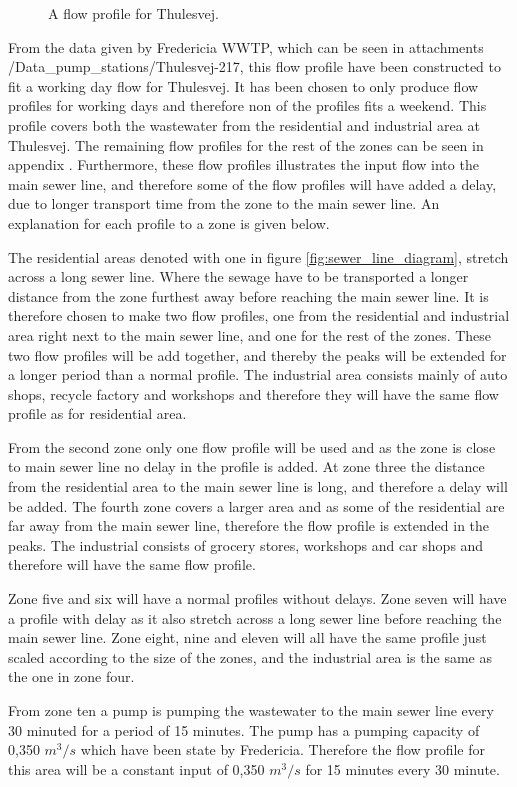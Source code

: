 \begin{figure}[H]
\centering

\caption{A flow profile for Thulesvej.}
\label{fig:flow_profile_thulevej}
\end{figure}  

From the data given by Fredericia WWTP, which can be seen in attachments /Data\_pump\_stations/Thulesvej-217, this flow profile have been constructed to fit a working day flow for Thulesvej. It has been chosen to only produce flow profiles for working days and therefore non of the profiles fits a weekend. This profile covers both the wastewater from the residential and industrial area at Thulesvej. The remaining flow profiles for the rest of the zones can be seen in appendix . Furthermore, these flow profiles illustrates the input flow into the main sewer line, and therefore some of the flow profiles will have added a delay, due to longer transport time from the zone to the main sewer line. An explanation for each profile to a zone is given below.    

The residential areas denoted with one in figure \ref{fig:sewer_line_diagram}, stretch across a long sewer line. Where the sewage have to be transported a longer distance from the zone furthest away before reaching the main sewer line. It is therefore chosen to make two flow profiles, one from the residential and industrial area right next to the main sewer line, and one for the rest of the zones. These two flow profiles will be add together, and thereby the peaks will be extended for a longer period than a normal profile. The industrial area consists mainly of auto shops, recycle factory and workshops and therefore they will have the same flow profile as for residential area. 

From the second zone only one flow profile will be used and as the zone is close to main sewer line no delay in the profile is added. At zone three the distance from the residential area to the main sewer line is long, and therefore a delay will be added. The fourth zone covers a larger area and as some of the residential are far away from the main sewer line, therefore the flow profile is extended in the peaks. The industrial consists of grocery stores, workshops and car shops and therefore will have the same flow profile.

Zone five and six will have a normal profiles without delays. Zone seven will have a profile with delay as it also stretch across a long sewer line before reaching the main sewer line. Zone eight, nine and eleven will all have the same profile just scaled according to the size of the zones, and the industrial area is the same as the one in zone four. 

From zone ten a pump is pumping the wastewater to the main sewer line every 30 minuted for a period of 15 minutes. The pump has a pumping capacity of 0,350 $m^3/s$ which have been state by Fredericia. Therefore the flow profile for this area will be a constant input of 0,350 $m^3/s$ for 15 minutes every 30 minute. 

